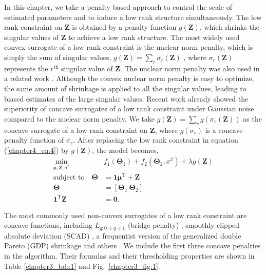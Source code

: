 In this chapter, we take a penalty based approach to control the scale of estimated parameters and to induce a low rank structure simultaneously. The low rank constraint on $\mathbf{Z}$ is obtained by a penalty function $g(\mathbf{Z})$, which shrinks the singular values of $\mathbf{Z}$ to achieve a low rank structure. The most widely used convex surrogate of a low rank constraint is the nuclear norm penalty, which is simply the sum of singular values, $g(\mathbf{Z}) = \sum_{r} \sigma_r(\mathbf{Z})$ \cite{koltchinskii2011nuclear}, where $\sigma_r(\mathbf{Z})$ represents the $r^{\text{th}}$ singular value of $\mathbf{Z}$. The nuclear norm penalty was also used in a related work \cite{wu2015fast}. Although the convex nuclear norm penalty is easy to optimize, the same amount of shrinkage is applied to all the singular values, leading to biased estimates of the large singular values. Recent work \cite{gavish2017optimal, lu2015generalized} already showed the superiority of concave surrogates of a low rank constraint under Gaussian noise compared to the nuclear norm penalty. We take $g(\mathbf{Z}) = \sum_{r} g(\sigma_r(\mathbf{Z}))$ as the concave surrogate of a low rank constraint on $\mathbf{Z}$, where $g(\sigma_r)$ is a concave penalty function of $\sigma_r$. After replacing the low rank constraint in equation (\ref{chapter4_eq:4}) by $g(\mathbf{Z})$, the model becomes,
\begin{equation}\label{chapter4_eq:5}
\begin{aligned}
    \min_{\bm{\mu},\mathbf{Z},\sigma^2} \quad & f_1(\mathbf{\Theta}_1) + f_2(\mathbf{\Theta}_2,\sigma^2) + \lambda g(\mathbf{Z}) \\
    \text{subject to} \quad \mathbf{\Theta} &= \mathbf{1}\bm{\mu}^{\text{T}} + \mathbf{Z} \\
     \mathbf{\Theta} &= [\mathbf{\Theta}_1 ~ \mathbf{\Theta}_2] \\
     \mathbf{1}^{\text{T}}\mathbf{Z} &= \mathbf{0}.
\end{aligned}
\end{equation}

The most commonly used non-convex surrogates of a low rank constraint are concave functions, including $L_{q:0 < q < 1}$ (bridge penalty) \cite{fu1998penalized,liu2007support}, smoothly clipped absolute deviation (SCAD) \cite{fan2001variable}, a frequentist version of the generalized double Pareto (GDP) shrinkage \cite{armagan2013generalized} and others \cite{lu2015generalized}. We include the first three concave penalties in the algorithm. Their formulas and their thresholding properties are shown in Table \ref{chapter3_tab:1} and Fig.~\ref{chapter3_fig:1}.


